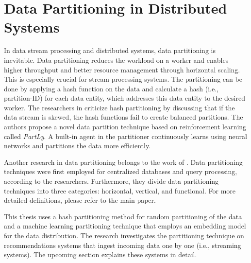 \section{Data Partitioning in Distributed Systems}
\label{sec:data-partitioning}
In data stream processing and distributed systems, data partitioning is inevitable. Data partitioning reduces the workload on a worker and enables higher throughput and better resource management through horizontal scaling. This is especially crucial for stream processing systems. The partitioning can be done by applying a hash function on the data and calculate a hash (i.e., partition-ID) for each data entity, which addresses this data entity to the desired worker. The researchers in \cite{abdelhamidPartLyLearningData2020} criticize hash partitioning by discussing that if the data stream is skewed, the hash functions fail to create balanced partitions. The authors propose a novel data partition technique based on reinforcement learning called \emph{PartLy}. A built-in agent in the partitioner continuously learns using neural networks and partitions the data more efficiently.


Another research in data partitioning belongs to the work of \cite{mahmudSurveyDataPartitioning2020}. Data partitioning techniques were first employed for centralized databases and query processing, according to the researchers. Furthermore, they divide data partitioning techniques into three categories: horizontal, vertical, and functional. For more detailed definitions, please refer to the main paper.


This thesis uses a hash partitioning method for random partitioning of the data and a machine learning partitioning technique that employs an embedding model for the data distribution. The research investigates the partitioning technique on recommendations systems that ingest incoming data one by one (i.e., streaming systems). The upcoming section explains these systems in detail.

